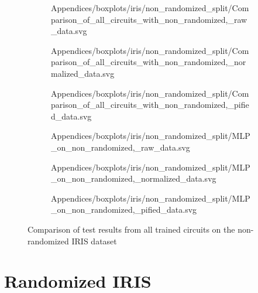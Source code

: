\begin{figure}[!h]
    \begin{subfigure}{.5\textwidth}
        \centering
        
        {Appendices/boxplots/iris/non_randomized_split/Comparison_of_all_circuits_with_non_randomized,_raw_data.svg}
    \end{subfigure}
    \begin{subfigure}{.5\textwidth}
        \centering
        
        {Appendices/boxplots/iris/non_randomized_split/Comparison_of_all_circuits_with_non_randomized,_normalized_data.svg}
    \end{subfigure}
    \begin{subfigure}{.5\textwidth}
        \centering
        
        {Appendices/boxplots/iris/non_randomized_split/Comparison_of_all_circuits_with_non_randomized,_pified_data.svg}
    \end{subfigure}
    \begin{subfigure}{.5\textwidth}
        \centering
        
        {Appendices/boxplots/iris/non_randomized_split/MLP_on_non_randomized,_raw_data.svg}
    \end{subfigure}
    \begin{subfigure}{.5\textwidth}
        \centering
        
        {Appendices/boxplots/iris/non_randomized_split/MLP_on_non_randomized,_normalized_data.svg}
    \end{subfigure}
    \begin{subfigure}{.5\textwidth}
        \centering
        
        {Appendices/boxplots/iris/non_randomized_split/MLP_on_non_randomized,_pified_data.svg}
    \end{subfigure}
    \caption{Comparison of test results from all trained circuits on the non-randomized IRIS dataset}
    \label{fig:circuits_results_non_r_iris}
\end{figure}
\clearpage

\section{Randomized IRIS}
\label{chapter:iris_randomized}

